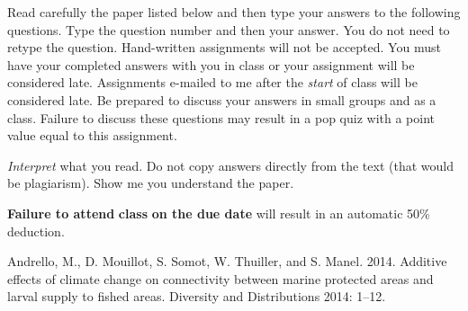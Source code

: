 \documentclass[12pt, addpoints]{exam}
\begin{document}
Read carefully the paper listed below and then type your answers to the following questions.
Type the question number and then your answer. You do not need to retype the question. Hand-written
assignments will not be accepted. You must have your completed answers
with you in class or your assignment will be considered late. Assignments e-mailed to me after the \emph{start} of class will be
considered late. Be prepared to discuss your answers in small groups and as a class. Failure
to discuss these questions may result in a pop quiz with a point value
equal to this assignment.

\emph{Interpret} what you read. Do not copy answers directly from the text (that would
be plagiarism). Show me you understand the paper.

\textbf{Failure to attend} \textbf{class} \textbf{on the due date} will
result in an automatic 50\% deduction.

\begin{hangparas}{1.5em}{1}
Andrello, M., D. Mouillot, S. Somot, W. Thuiller, and S. Manel. 2014. Additive effects of climate change on connectivity between marine protected areas and larval supply to fished areas. Diversity and Distributions 2014: 1--12.

\end{hangparas}
\end{document}

